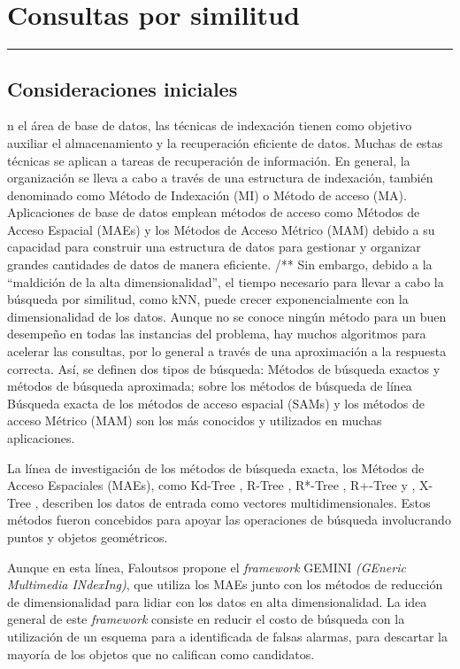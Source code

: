 \chapter{Consultas por similitud}
\hrule \bigskip \vspace*{1cm}


\section{Consideraciones iniciales}

n el área de base de datos, las técnicas de indexación tienen como objetivo auxiliar el almacenamiento y la recuperación eficiente de datos. Muchas de estas técnicas se aplican a tareas de recuperación de información. En general, la organización se lleva a cabo a través de una estructura de indexación, también denominado como Método de Indexación (MI) o Método de acceso (MA). Aplicaciones de base de datos emplean métodos de acceso como Métodos de Acceso Espacial (MAEs) y los Métodos de Acceso Métrico (MAM) debido a su capacidad para construir una estructura de datos para gestionar y organizar grandes cantidades de datos de manera eficiente.
/**
Sin embargo, debido a la ``maldición de la alta dimensionalidad'', el tiempo necesario para llevar a cabo la búsqueda por similitud, como kNN, puede crecer exponencialmente con la dimensionalidad de los datos. Aunque no se conoce ningún método para un buen desempeño en todas las instancias del problema, hay muchos algoritmos para acelerar las consultas, por lo general a través de una aproximación a la respuesta correcta. Así, se definen dos tipos de búsqueda: Métodos de búsqueda exactos y métodos de búsqueda aproximada; sobre los métodos de búsqueda de línea Búsqueda exacta de los métodos de acceso espacial (SAMs) y los métodos de acceso Métrico (MAM) son los más conocidos y utilizados en muchas aplicaciones.

La línea de investigación de los métodos de búsqueda exacta, los Métodos de  Acceso Espaciales (MAEs), como Kd-Tree \cite{kdt}, R-Tree \cite{Guttman1984}, R*-Tree \cite{rstartree}, R+-Tree \cite{rplustree}  y , X-Tree \cite{xtree}, describen los datos de entrada como vectores multidimensionales. Estos métodos fueron concebidos para apoyar las operaciones de búsqueda involucrando puntos y objetos geométricos.

Aunque en esta línea, Faloutsos \cite{GEMINI_Faloutsos} propone el \textit{framework} GEMINI \textit{ (GEneric Multimedia INdexIng)}, que utiliza los MAEs junto con los métodos  de reducción de dimensionalidad para lidiar con los datos en alta dimensionalidad.  La idea general de este \textit{framework} consiste en reducir el costo de búsqueda con la utilización de un esquema para a identificada de falsas alarmas, para descartar la mayoría de los objetos que no califican como candidatos.

